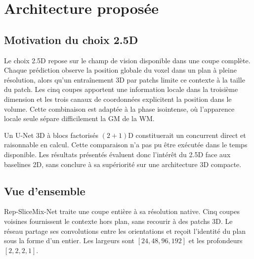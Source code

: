 \documentclass[11pt,a4paper]{article}
\begin{document}
\section{Architecture proposée}

\subsection{Motivation du choix 2.5D}

Le choix 2.5D repose sur le champ de vision disponible dans une coupe complète.
Chaque prédiction observe la position globale du voxel dans un plan à pleine
résolution, alors qu'un entraînement 3D par patchs limite ce contexte à la taille
du patch. Les cinq coupes apportent une information locale dans la troisième
dimension et les trois canaux de coordonnées explicitent la position dans le
volume. Cette combinaison est adaptée à la phase isointense, où l'apparence
locale seule sépare difficilement la GM de la WM.

Un U-Net 3D à blocs factorisés $(2+1)$D constituerait un concurrent direct et
raisonnable en calcul. Cette comparaison n'a pas pu être exécutée dans le temps
disponible. Les résultats présentés évaluent donc l'intérêt du 2.5D face aux
baselines 2D, sans conclure à sa supériorité sur une architecture 3D compacte.

\subsection{Vue d'ensemble}

Rep-SliceMix-Net traite une coupe entière à sa résolution native. Cinq coupes
voisines fournissent le contexte hors plan, sans recourir à des patchs 3D. Le
réseau partage ses convolutions entre les orientations et reçoit l'identité du
plan sous la forme d'un entier. Les largeurs sont $[24,48,96,192]$ et les
profondeurs $[2,2,2,1]$.
\end{document}
